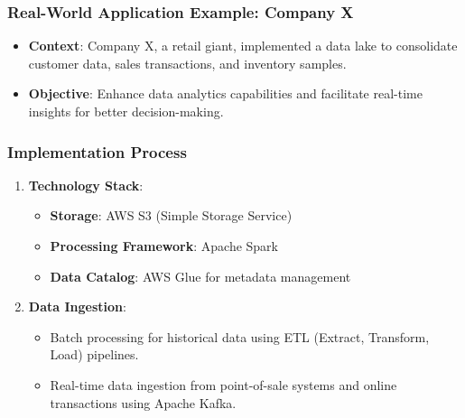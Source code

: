 \documentclass[aspectratio=169]{beamer}
\begin{document}
\begin{frame}[fragile]
    \frametitle{Real-World Application Example: Company X}
    \begin{itemize}
        \item \textbf{Context}: Company X, a retail giant, implemented a data lake to consolidate customer data, sales transactions, and inventory samples.
        \item \textbf{Objective}: Enhance data analytics capabilities and facilitate real-time insights for better decision-making.
    \end{itemize}
\end{frame}

\begin{frame}[fragile]
    \frametitle{Implementation Process}
    \begin{enumerate}
        \item \textbf{Technology Stack}:
        \begin{itemize}
            \item \textbf{Storage}: AWS S3 (Simple Storage Service)
            \item \textbf{Processing Framework}: Apache Spark
            \item \textbf{Data Catalog}: AWS Glue for metadata management
        \end{itemize}
        
        \item \textbf{Data Ingestion}:
        \begin{itemize}
            \item Batch processing for historical data using ETL (Extract, Transform, Load) pipelines.
            \item Real-time data ingestion from point-of-sale systems and online transactions using Apache Kafka.
        \end{itemize}
    \end{enumerate}
\end{frame}
\end{document}
